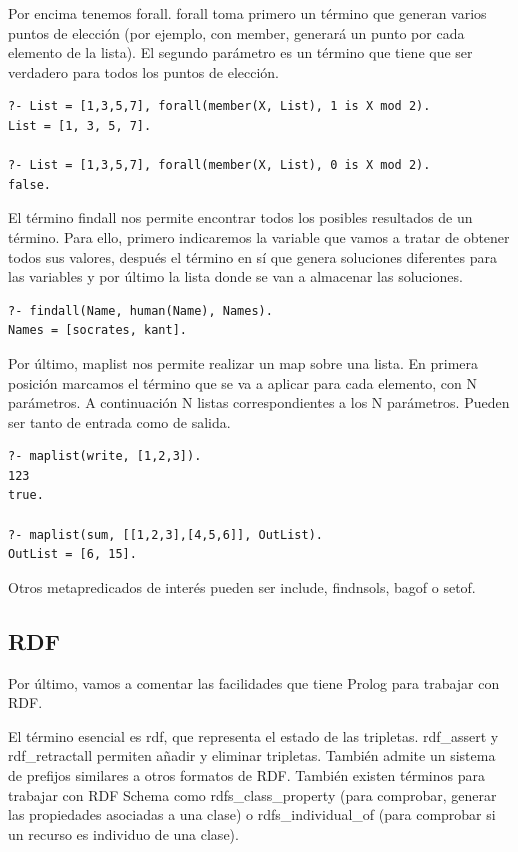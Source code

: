\documentclass[12pt]{report} %
\begin{document}
Por encima tenemos forall. forall toma primero un término que generan varios puntos de elección (por ejemplo, con member, generará un punto por cada elemento de la lista). El segundo parámetro es un término que tiene que ser verdadero para todos los puntos de elección.

\begin{lstlisting}
?- List = [1,3,5,7], forall(member(X, List), 1 is X mod 2).
List = [1, 3, 5, 7].

?- List = [1,3,5,7], forall(member(X, List), 0 is X mod 2).
false.
\end{lstlisting}

El término findall nos permite encontrar todos los posibles resultados de un término. Para ello, primero indicaremos la variable que vamos a tratar de obtener todos sus valores, después el término en sí que genera soluciones diferentes para las variables y por último la lista donde se van a almacenar las soluciones.

\begin{lstlisting}
?- findall(Name, human(Name), Names).
Names = [socrates, kant].
\end{lstlisting}

Por último, maplist nos permite realizar un map sobre una lista. En primera posición marcamos el término que se va a aplicar para cada elemento, con N parámetros. A continuación N listas correspondientes a los N parámetros. Pueden ser tanto de entrada como de salida.

\begin{lstlisting}
?- maplist(write, [1,2,3]).
123
true.

?- maplist(sum, [[1,2,3],[4,5,6]], OutList).
OutList = [6, 15].
\end{lstlisting}

Otros metapredicados de interés pueden ser include, findnsols, bagof o setof.

\subsection{RDF}

Por último, vamos a comentar las facilidades que tiene Prolog para trabajar con RDF.

El término esencial es rdf, que representa el estado de las tripletas. rdf\_assert y rdf\_retractall permiten añadir y eliminar tripletas. También admite un sistema de prefijos similares a otros formatos de RDF. También existen términos para trabajar con RDF Schema como rdfs\_class\_property (para comprobar, generar las propiedades asociadas a una clase) o rdfs\_individual\_of (para comprobar si un recurso es individuo de una clase).
\end{document}
